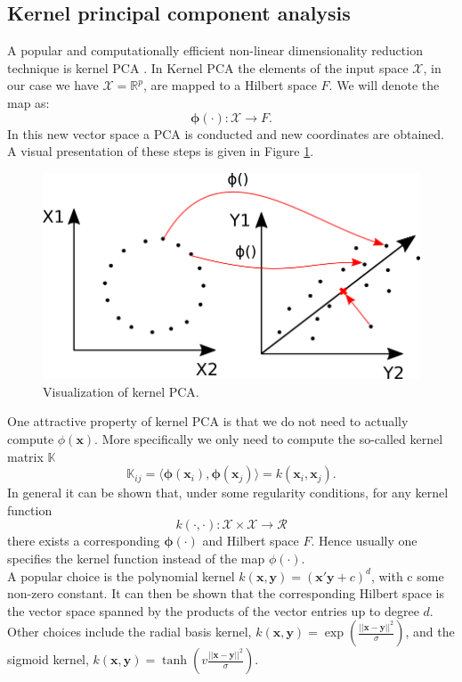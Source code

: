 \subsection{Kernel principal component analysis}
A popular and computationally efficient non-linear dimensionality reduction technique is kernel PCA \parencite{scholkopf_kernel_1997}. In Kernel PCA the elements of the input space $\mathcal{X}$, in our case we have $\mathcal{X} = \mathbb{R}^p$, are mapped to a Hilbert space $F$. We will denote the map as: 
\[\bm{\phi}(\cdot): \mathcal{X} \to F.\]
In this new vector space a PCA is conducted and new coordinates are obtained. A visual presentation of these steps is given in Figure \ref{fig:KernelPCA}. \\
\begin{figure}[!htb]
\centering
\includegraphics[scale=0.5]{VectorGraphics/KernelPCA.png}
\caption{\label{fig:KernelPCA}Visualization of kernel PCA.}
\end{figure}

One attractive property of kernel PCA is that we do not need to actually compute $\phi(\bm{x})$. More specifically we only need to compute the so-called kernel matrix $\mathbb{K}$
\[\mathbb{K}_{ij} = \langle \bm{\phi} (\bm{x}_i), \bm{\phi} (\bm{x}_j)  \rangle = k(\bm{x}_i,\bm{x}_j).\]
In general it can be shown that, under some regularity conditions, for any kernel function
\[k(\cdot,\cdot): \mathcal{X} \times \mathcal{X} \to \mathcal{R}\] 
there exists a corresponding $\bm{\phi}(\cdot)$ and Hilbert space $F$. Hence usually one specifies the kernel function instead of the map $\phi(\cdot)$.\\ 

A popular choice is the polynomial kernel $k(\bm{x},\bm{y}) = (\bm{x}' \bm{y} + c)^d$, with c some non-zero constant. It can then be shown that the corresponding Hilbert space is the vector space spanned by the products of the vector entries up to degree $d$. Other choices include the radial basis kernel, $k(\bm{x},\bm{y}) = \exp{(\frac{\vert \vert \bm{x} -\bm{y}\vert \vert ^2}{\sigma})}$, and the sigmoid kernel, $k(\bm{x},\bm{y}) = \tanh (v\frac{\vert \vert \bm{x} -\bm{y}\vert \vert ^2}{\sigma})$. \\

